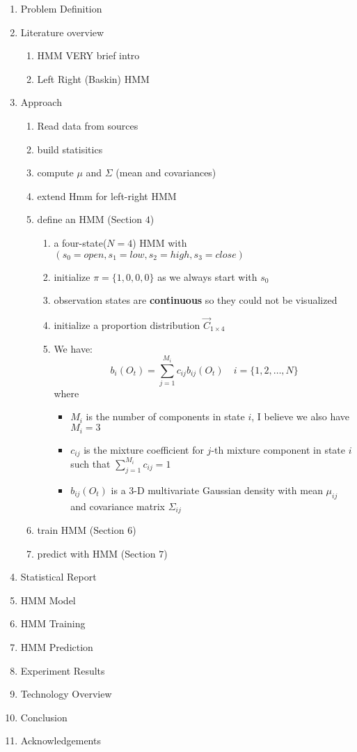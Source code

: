 \documentclass{acm_proc_article-sp}
\begin{document}
\begin{enumerate}
  \item Problem Definition
  \item Literature overview
  \begin{enumerate}
    \item HMM VERY brief intro
    \item Left Right (Baskin) HMM
  \end{enumerate}
  \item Approach
  \begin{enumerate}
    \item Read data from sources
    \item build statisitics
    \item compute $\mu$ and $\Sigma$ (mean and covariances)
    \item extend Hmm for left-right HMM
    \item define an HMM (Section $4$)
    \begin{enumerate}
      \item a four-state($N = 4$) HMM with $(s_0 = open, s_1 = low, s_2 = high, s_3 = close)$
      \item initialize $\pi = \{1, 0, 0, 0\}$ as we always start with $s_0$
      \item observation states are \textbf{continuous} so they could not be visualized
      \item initialize a proportion distribution $\vec{C}_{1 \times 4}$
      \item We have:
      \begin{equation}
      b_i(O_t) = \sum_{j=1}^{M_i} c_{ij}b_{ij}(O_t) \quad i = \{1, 2, \ldots, N\}
      \end{equation}
	  where
	  \begin{itemize}
        \item $M_i$ is the number of components in state $i$, I believe we also have $M_i = 3$
        \item $c_{ij}$ is the mixture coefficient for $j$-th mixture component in state $i$ such that $\sum_{j=1}^{M_i}
        c_{ij} = 1$
        \item $b_{ij}(O_t)$ is a $3$-D multivariate Gaussian density with mean $\mu_{ij}$ and covariance matrix
        $\Sigma_{ij}$
      \end{itemize}
    \end{enumerate}
    \item train HMM (Section $6$)
    \item predict with HMM (Section $7$)
  \end{enumerate}
  \item Statistical Report
  \item HMM Model
  \item HMM Training
  \item HMM Prediction
  \item Experiment Results
  \item Technology Overview
  \item Conclusion
  \item Acknowledgements
\end{enumerate}
\end{document}
